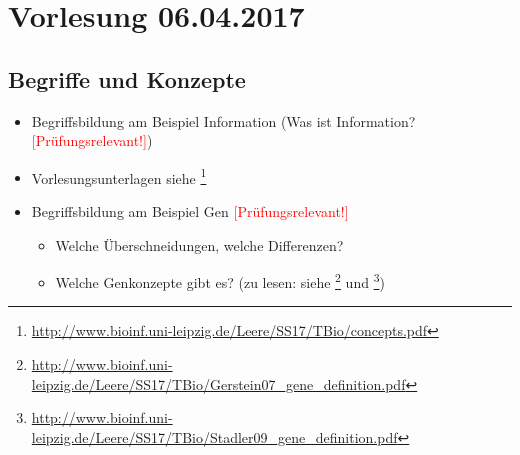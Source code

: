 \section{Vorlesung 06.04.2017}

\subsection{Begriffe und Konzepte}
\begin{itemize}
	\item Begriffsbildung am Beispiel Information (Was ist Information? \textcolor{red}{[Prüfungsrelevant!]})
	\item Vorlesungsunterlagen siehe \footnote{\url{http://www.bioinf.uni-leipzig.de/Leere/SS17/TBio/concepts.pdf}}
	\item Begriffsbildung am Beispiel Gen \textcolor{red}{[Prüfungsrelevant!]}
	\begin{itemize}
			\item Welche Überschneidungen, welche Differenzen?
			\item Welche Genkonzepte gibt es? (zu lesen: siehe \footnote{\url{http://www.bioinf.uni-leipzig.de/Leere/SS17/TBio/Gerstein07_gene_definition.pdf}} und \footnote{\url{http://www.bioinf.uni-leipzig.de/Leere/SS17/TBio/Stadler09_gene_definition.pdf}})
		\end{itemize}
\end{itemize}